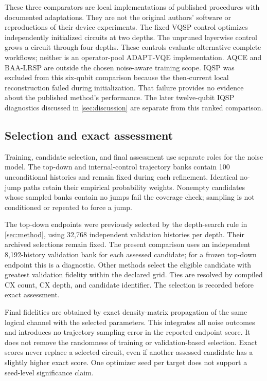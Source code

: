 

These three comparators are local implementations of published procedures
with documented adaptations. They are not the original authors' software
or reproductions of their device experiments. The fixed VQSP control
optimizes independently initialized circuits at two depths. The unpruned
layerwise control grows a circuit through four depths. These controls
evaluate alternative complete workflows; neither is an operator-pool
ADAPT-VQE implementation. AQCE and BAA-LRSP are outside the chosen
noise-aware training scope. IQSP was excluded from this six-qubit comparison
because the then-current local reconstruction failed during initialization.
That failure provides no evidence about the published method's performance.
The later twelve-qubit IQSP diagnostics discussed in \cref{sec:discussion}
are separate from this ranked comparison.

\subsection{Selection and exact assessment}

Training, candidate selection, and final assessment use separate roles for
the noise model. The top-down and internal-control trajectory banks contain
100 unconditional histories and remain fixed during each refinement.
Identical no-jump paths retain their empirical probability weights.
Nonempty candidates whose sampled banks contain no jumps fail the coverage
check; sampling is not conditioned or repeated to force a jump.

The top-down endpoints were previously selected by the depth-search rule
in \cref{sec:method}, using 32,768 independent validation histories per
depth. Their archived selections remain fixed. The present comparison uses
an independent 8,192-history validation bank for each assessed candidate;
for a frozen top-down endpoint this is a diagnostic. Other methods select
the eligible candidate with greatest validation fidelity within the
declared grid. Ties are resolved by compiled CX count, CX depth, and
candidate identifier. The selection is recorded before exact assessment.

Final fidelities are obtained by exact density-matrix propagation of the
same logical channel with the selected parameters. This integrates all
noise outcomes and introduces no trajectory sampling error in the
reported endpoint score. It does not remove the randomness of training
or validation-based selection. Exact scores never replace a selected
circuit, even if another assessed candidate has a slightly higher exact
score. One optimizer seed per target does not support a seed-level
significance claim.

